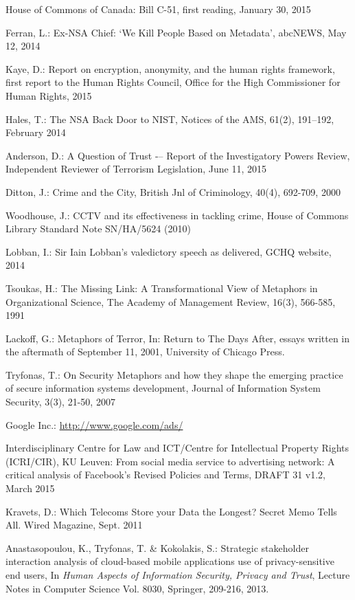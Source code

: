 \documentclass{llncs}
\begin{document}
\begin{thebibliography}{}
House of Commons of Canada:
Bill C-51, first reading, January 30, 2015

Ferran, L.:
Ex-NSA Chief: `We Kill People Based on Metadata', abcNEWS, May 12, 2014

Kaye, D.:
Report on encryption, anonymity, and the human rights framework, first report to the Human Rights Council, Office for the High Commissioner for Human Rights, 2015

Hales, T.:
The NSA Back Door to NIST, Notices of the AMS, 61(2), 191--192, February 2014

Anderson, D.:
A Question of Trust -– Report of the Investigatory Powers Review, Independent Reviewer of Terrorism Legislation, June 11, 2015

Ditton, J.:
Crime and the City, British Jnl of Criminology, 40(4), 692-709, 2000

Woodhouse, J.:
CCTV and its effectiveness in tackling crime, House of Commons Library Standard Note SN/HA/5624 (2010)

Lobban, I.:
Sir Iain Lobban's valedictory speech as delivered, GCHQ website, 2014

Tsoukas, H.:
The Missing Link: A Transformational View of Metaphors in Organizational Science, The Academy of Management Review, 16(3), 566-585, 1991 

Lackoff, G.:
Metaphors of Terror, In: Return to The Days After, essays written in the aftermath of September 11, 2001, University of Chicago Press. 

Tryfonas, T.:
On Security Metaphors and how they shape the emerging practice of secure information systems development, Journal of Information System Security, 3(3), 21-50, 2007

Google Inc.:
\url{http://www.google.com/ads/}

Interdisciplinary Centre for Law and ICT/Centre for Intellectual Property Rights (ICRI/CIR), KU Leuven:
From social media service to advertising network: A critical analysis of Facebook’s Revised Policies and Terms, DRAFT 31 v1.2, March 2015

Kravets, D.:
Which Telecoms Store your Data the Longest? Secret Memo Tells All. Wired Magazine, Sept. 2011

Anastasopoulou, K., Tryfonas, T. \& Kokolakis, S.:
Strategic stakeholder interaction analysis of cloud-based mobile applications use of privacy-sensitive end users, In {\em {Human Aspects of Information Security, Privacy and Trust}}, Lecture Notes in Computer Science Vol. 8030, Springer, 209-216, 2013.


\end{thebibliography}
\end{document}
